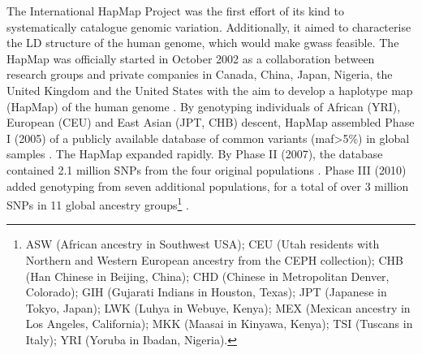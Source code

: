 The International HapMap Project was the first effort of its kind to systematically catalogue genomic variation. 
Additionally, it aimed to characterise the LD structure of the human genome, which would make \glspl{gwas} feasible. 
The HapMap was officially started in October 2002 as a collaboration between research groups and private companies in Canada, China, Japan, Nigeria, the United Kingdom and the United States with the aim to develop a haplotype map (HapMap) of the human genome \cite{international2003international}.
By genotyping individuals of African (YRI), European (CEU) and East Asian (JPT, CHB) descent, HapMap assembled Phase I (2005) of a publicly available database of common variants (\gls{maf}>5\%) in global samples \cite{international2005haplotype}. 
The HapMap expanded rapidly. 
By Phase II (2007), the database contained 2.1 million SNPs from the four original populations \cite{international2007second}.
Phase III (2010) added genotyping from seven additional populations, for a total of over 3 million SNPs in 11 global ancestry groups\footnote{ASW (African ancestry in Southwest USA); CEU (Utah residents with Northern and Western European ancestry from the CEPH collection); CHB (Han Chinese in Beijing, China); CHD (Chinese in Metropolitan Denver, Colorado); GIH (Gujarati Indians in Houston, Texas); JPT (Japanese in Tokyo, Japan); LWK (Luhya in Webuye, Kenya); MEX (Mexican ancestry in Los Angeles, California); MKK (Maasai in Kinyawa, Kenya); TSI (Tuscans in Italy); YRI (Yoruba in Ibadan, Nigeria).} \cite{international2010integrating}.\\ 




